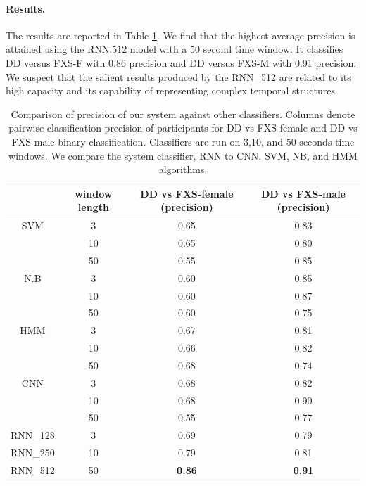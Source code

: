 \documentclass{llncs}
\begin{document}
\paragraph{Results.} The results are reported in Table  \ref{table:profiler}. We find that the highest average precision is attained using the RNN.512 model with a 50 second time window. It classifies DD versus FXS-F with 0.86 precision and DD versus FXS-M with 0.91 precision. We suspect that the salient results produced by the RNN\_512 are related to its high capacity and its capability of representing complex temporal structures.

\begin{table}[t]
    \centering
    \begin{tabular}{c|c|c|c}
      & window length & DD vs FXS-female (precision) & DD vs FXS-male (precision)\\
      \hline
      SVM  & 3   & 0.65 & 0.83\\
      & 10 & 0.65 & 0.80 \\
      & 50 & 0.55 & 0.85 \\

      \hline
      N.B   & 3  & 0.60 & 0.85\\
      & 10 & 0.60 & 0.87\\
      & 50 & 0.60 & 0.75\\

      \hline
      HMM & 3  & 0.67 & 0.81\\
      & 10 & 0.66 & 0.82\\
      & 50 & 0.68 & 0.74\\

      \hline
      CNN & 3 & 0.68 & 0.82 \\
      & 10 & 0.68 & 0.90\\
      & 50 & 0.55 & 0.77\\
      \hline
      RNN\_128  & 3 &  0.69 & 0.79 \\
      RNN\_250 & 10 &   0.79 &  0.81\\
      RNN\_512 &  50 & {\bf 0.86} & {\bf 0.91}\\

    \end{tabular}
    \caption{Comparison of precision of our system against other classifiers. Columns denote pairwise classification precision of participants for DD vs FXS-female and DD vs FXS-male binary classification. Classifiers are run on 3,10, and 50 seconds time windows. We compare the system classifier, RNN to CNN, SVM, NB, and HMM algorithms.}
    \label{table:profiler}
  \end{table}
  
\end{document}
